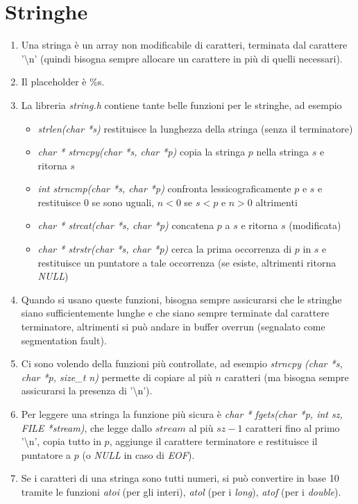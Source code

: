 \documentclass[a4paper,11pt]{article}
\begin{document}
\section{Stringhe}
\begin{enumerate}[resume]
	\item Una stringa è un array non modificabile di caratteri, terminata dal carattere '\textbackslash n' (quindi bisogna sempre allocare un carattere in più di quelli necessari).
	\item Il placeholder è \%s.
	\item La libreria \textit{string.h} contiene tante belle funzioni per le stringhe, ad esempio
	\begin{itemize}
		\item \textit{strlen(char *s)} restituisce la lunghezza della stringa (senza il terminatore)
		\item \textit{char * strncpy(char *s, char *p)} copia la stringa $p$ nella stringa $s$ e ritorna $s$
		\item \textit{int strncmp(char *s, char *p)} confronta lessicograficamente $p$ e $s$ e restituisce 0 se sono uguali, $n<0$ se $s<p$ e $n>0$ altrimenti
		\item \textit{char * strcat(char *s, char *p)} concatena $p$ a $s$ e ritorna $s$ (modificata)
		\item \textit{char * strstr(char *s, char *p)} cerca la prima occorrenza di $p$ in $s$ e restituisce un puntatore a tale occorrenza (se esiste, altrimenti ritorna \textit{NULL})
	\end{itemize}
	\item Quando si usano queste funzioni, bisogna sempre assicurarsi che le stringhe siano sufficientemente lunghe e che siano sempre terminate dal carattere terminatore, altrimenti si può andare in buffer overrun (segnalato come segmentation fault).
	\item Ci sono volendo della funzioni più controllate, ad esempio \textit{strncpy (char *s, char *p, size\_t n)} permette di copiare al più $n$ caratteri (ma bisogna sempre assicurarsi la presenza di '\textbackslash n').
	\item Per leggere una stringa la funzione più sicura è \textit{char * fgets(char *p, int sz, FILE *stream)}, che legge dallo $stream$ al più $sz-1$ caratteri fino al primo '\textbackslash n', copia tutto in $p$, aggiunge il carattere terminatore e restituisce il puntatore a $p$ (o \textit{NULL} in caso di \textit{EOF}).
	\item Se i caratteri di una stringa sono tutti numeri, si può convertire in base 10 tramite le funzioni \textit{atoi} (per gli interi), \textit{atol} (per i \textit{long}), \textit{atof} (per i \textit{double}).

\end{enumerate}
\end{document}
